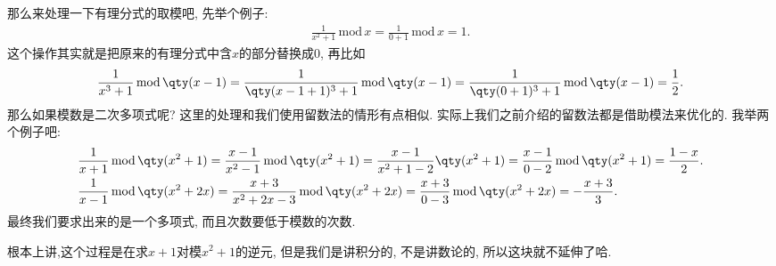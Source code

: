 \documentclass{ctexbook}
\newcommand{\m}{\,\mathrm{mod}\,}
\begin{document}
{那么来处理一下有理分式的取模吧, 先举个例子: 
\begin{align*}
\frac{1}{x^{2}+1}\m x=\frac{1}{0+1}\m x=1
.\end{align*}
这个操作其实就是把原来的有理分式中含$x$的部分替换成$0$, 再比如
\begin{align*}
\frac{1}{x^{3}+1}\m\qty(x-1)=\frac{1}{\qty(x-1+1)^{3}+1}\m\qty(x-1)=\frac{1}{\qty(0+1)^{3}+1}\m\qty(x-1)=\frac{1}{2}
.\end{align*}
那么如果模数是二次多项式呢? 这里的处理和我们使用留数法的情形有点相似. 实际上我们之前介绍的留数法都是借助模法来优化的. 我举两个例子吧: 
\begin{align*}
{}&\frac{1}{x+1}\m\qty(x^{2}+1)=\frac{x-1}{x^{2}-1}\m\qty(x^{2}+1)=\frac{x-1}{x^{2}+1-2}\qty(x^{2}+1)=\frac{x-1}{0-2}\m\qty(x^{2}+1)=\frac{1-x}{2}.\\
{}&\frac{1}{x-1}\m\qty(x^{2}+2x)=\frac{x+3}{x^{2}+2x-3}\m\qty(x^{2}+2x)=\frac{x+3}{0-3}\m\qty(x^{2}+2x)=-\frac{x+3}{3}
.\end{align*}
最终我们要求出来的是一个多项式, 而且次数要低于模数的次数. \par
根本上讲,这个过程是在求$x+1$对模$x^{2}+1$的逆元, 但是我们是讲积分的, 不是讲数论的, 所以这块就不延伸了哈. \par
}
\end{document}
